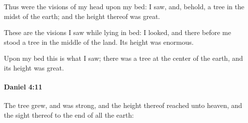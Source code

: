 			\begin{versebox}
					\item[BHS] 
					\item[LXX] 
					\item[ASV] Thus were the visions of my head upon my bed: I saw, and, behold, a tree in the midst of the earth; and the height thereof was great.
					\item[NIV] These are the visions I saw while lying in bed: I looked, and there before me stood a tree in the middle of the land. Its height was enormous.
					\item[NRSV] Upon my bed this is what I saw; there was a tree at the center of the earth, and its height was great.
			\end{versebox}

		\paragraph{Daniel 4:11} %
			\label{DANIEL-4-11}

			The tree grew, and was strong, and the height thereof reached unto heaven, and the sight thereof to the end of all the earth:

